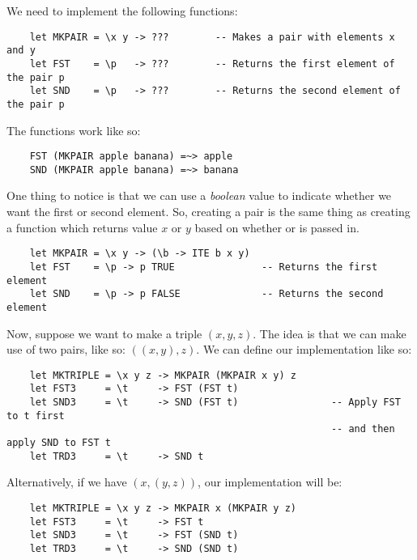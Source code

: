 \documentclass[letterpaper]{article}
\begin{document}
We need to implement the following functions: 
\begin{verbatim}
    let MKPAIR = \x y -> ???        -- Makes a pair with elements x and y
    let FST    = \p   -> ???        -- Returns the first element of the pair p 
    let SND    = \p   -> ???        -- Returns the second element of the pair p 
\end{verbatim}
The functions work like so: 
\begin{verbatim}
    FST (MKPAIR apple banana) =~> apple 
    SND (MKPAIR apple banana) =~> banana 
\end{verbatim}
One thing to notice is that we can use a \emph{boolean} value to indicate whether we want the first or second element. So, creating a pair is the same thing as creating a function which returns value $x$ or $y$ based on whether  or  is passed in.
\begin{verbatim}
    let MKPAIR = \x y -> (\b -> ITE b x y)
    let FST    = \p -> p TRUE               -- Returns the first element 
    let SND    = \p -> p FALSE              -- Returns the second element
\end{verbatim}
Now, suppose we want to make a triple $(x, y, z)$. The idea is that we can make use of two pairs, like so: $((x, y), z)$. We can define our implementation like so: 
\begin{verbatim}
    let MKTRIPLE = \x y z -> MKPAIR (MKPAIR x y) z
    let FST3     = \t     -> FST (FST t)
    let SND3     = \t     -> SND (FST t)                -- Apply FST to t first 
                                                        -- and then apply SND to FST t
    let TRD3     = \t     -> SND t
\end{verbatim}
Alternatively, if we have $(x, (y, z))$, our implementation will be: 
\begin{verbatim}
    let MKTRIPLE = \x y z -> MKPAIR x (MKPAIR y z)
    let FST3     = \t     -> FST t
    let SND3     = \t     -> FST (SND t)
    let TRD3     = \t     -> SND (SND t)
\end{verbatim}
\end{document}

